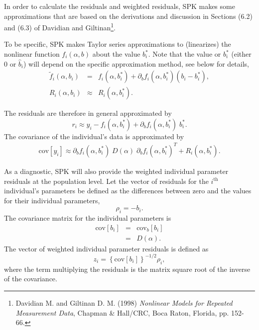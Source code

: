 \documentclass{article}
\begin{document}
In order to calculate the residuals and weighted residuals, SPK makes
some approximations that are based on the derivations and discussion
in Sections (6.2) and (6.3) of Davidian and Giltinan\footnote{
  Davidian M. and Giltinan D. M. (1998) 
  {\em Nonlinear Models for Repeated Measurement Data}, Chapman \&
  Hall/CRC, Boca Raton, Florida, pp. 152-66.
}.

To be specific, SPK makes Taylor series approximations to (linearizes)
the nonlinear function $f_i(\alpha,b)$
about the value $b^{\ast}_i$. Note that the value or $b^{\ast}_i$ 
(either 0 or $\hat{b}_i$) will
depend on the specific approximation method, see below for details,
  \begin{eqnarray}
    \tilde{f}_i(\alpha, b_i) & = &  f_i(\alpha, b^{\ast}_i)
      + \partial_b f_i(\alpha, b^{\ast}_i) ( b_i - b^{\ast}_i ) , \\
    R_i(\alpha, b_i) & \approx &  R_i(\alpha, b^{\ast}_i) .
  \end{eqnarray}

The residuals are therefore in general approximated by
  \begin{equation}
    r_i \approx y_i - f_i(\alpha, b^{\ast}_i)
      + \partial_b f_i(\alpha, b^{\ast}_i) \; b^{\ast}_i .
  \end{equation}
The covariance of the individual's data is approximated by
  \begin{eqnarray}
    \mbox{cov}[y_i] \approx \partial_b f_i(\alpha, b^{\ast}_i) \;
        D(\alpha) \; \partial_b f_i(\alpha, b^{\ast}_i)^T
      + R_i(\alpha, b^{\ast}_i) .
  \end{eqnarray}

As a diagnostic, SPK will also provide the weighted individual 
parameter residuals at the population level.
Let the vector of residuals for the $i^{\mbox{th}}$ individual's 
parameters be defined as the differences between zero and the 
values for their individual parameters,
  \begin{equation}
    \rho_i = - b_i .
  \end{equation}
The covariance matrix for the individual parameters is
  \begin{eqnarray}
    \mbox{cov}[b_i] & = & \mbox{cov}_{b}
          \left[ b_i \right] \nonumber \\
        & = & D(\alpha) .
  \end{eqnarray}
The vector of weighted individual parameter residuals is
defined as 
  \begin{equation}
    z_i = \left\{ \mbox{cov}[b_i] \right\}^{-1/2} \rho_i,
  \end{equation}
where the term multiplying the residuals is the matrix square 
root of the inverse of the covariance.
\end{document}
